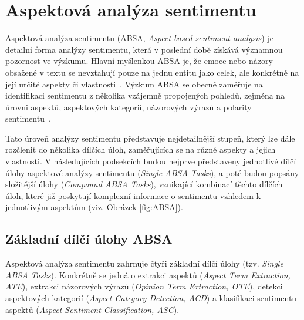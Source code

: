 \section{Aspektová analýza sentimentu}\label{absa}
Aspektová analýza sentimentu (ABSA, \emph{Aspect-based sentiment analysis}) je detailní forma analýzy sentimentu, která v poslední době získává významnou pozornost ve výzkumu. Hlavní myšlenkou ABSA je, že emoce nebo názory obsažené v textu se nevztahují pouze na jednu entitu jako celek, ale konkrétně na její určité aspekty či vlastnosti~\cite{TAN2020336}. Výzkum ABSA se obecně zaměřuje na identifikaci sentimentu z několika vzájemně propojených pohledů, zejména na úrovni aspektů, aspektových kategorií, názorových výrazů a polarity sentimentu~\cite{XU2020135}.~\cite{MAO2024102048}

Tato úroveň analýzy sentimentu představuje nejdetailnější stupeň, který lze dále rozčlenit do několika dílčích úloh, zaměřujících se na různé aspekty a jejich vlastnosti. V následujících podsekcích budou nejprve představeny jednotlivé dílčí úlohy aspektové analýzy sentimentu (\emph{Single ABSA Tasks}), a poté budou popsány složitější úlohy (\emph{Compound ABSA Tasks}), vznikající kombinací těchto dílčích úloh, které již poskytují komplexní informace o sentimentu vzhledem k jednotlivým aspektům (viz. Obrázek \ref{fig:ABSA}).

\subsection{Základní dílčí úlohy ABSA}
Aspektová analýza sentimentu zahrnuje čtyři základní dílčí úlohy (tzv. \emph{Single ABSA Tasks}). Konkrétně se jedná o extrakci aspektů (\emph{Aspect Term Extraction, ATE}), extrakci názorových výrazů (\emph{Opinion Term Extraction, OTE}), detekci aspektových kategorií (\emph{Aspect Category Detection, ACD}) a klasifikaci sentimentu aspektů (\emph{Aspect Sentiment Classification, ASC}).~\cite{MAO2024102048}

